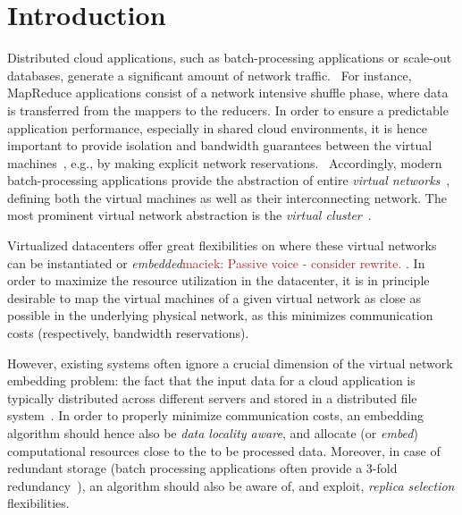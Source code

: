 \documentclass[9pt]{sigcomm-alternate}
\newcommand{\maciek}[1]{\textcolor{brown}{maciek: #1}}
\begin{document}
\section{Introduction}


Distributed cloud applications, such as batch-processing applications or scale-out databases, generate a significant amount of network traffic.~\cite{talk-about}
For instance, MapReduce applications consist of a network intensive shuffle phase,
where data is transferred from the mappers to the reducers.
In order to ensure a predictable application performance, especially in shared cloud environments,
it is hence important to provide isolation and bandwidth guarantees between the virtual machines~\cite{amazonbw},
e.g., by making explicit network reservations.~\cite{oktopus}
Accordingly, modern batch-processing applications provide the abstraction of entire \emph{virtual networks}~\cite{talk-about},
defining both the virtual machines
as well as their interconnecting network. The most prominent virtual network abstraction is the \emph{virtual cluster}~\cite{oktopus,proteus}.

Virtualized datacenters
offer great flexibilities on where these virtual networks
can be instantiated or \emph{embedded}\maciek{Passive voice - consider rewrite.}
.
In order to maximize the resource utilization in the datacenter, it is in principle desirable to
map the virtual machines of a given virtual network as close as possible
in the underlying physical network, as this minimizes communication costs (respectively, bandwidth reservations).~\cite{oktopus,proteus}

However, existing systems often ignore a crucial dimension of the virtual network embedding problem: 
the fact that the input data for a cloud application is typically distributed across different servers and stored in a distributed file system~\cite{hdfs}.
In order to properly minimize
communication costs, an embedding algorithm should hence also be \emph{data locality aware},
and allocate (or \emph{embed}) computational resources close to the to be processed data.
Moreover, in case of redundant storage (batch processing
applications often provide a 3-fold redundancy~\cite{hdfs}), an algorithm should also be aware of, and exploit, \emph{replica selection}
flexibilities.
\end{document}

